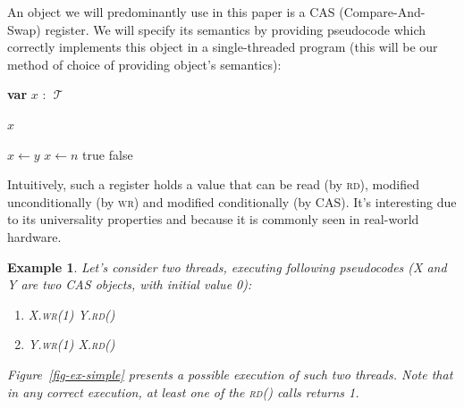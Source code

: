 \documentclass{thesis}
\def\T{\ensuremath{\operatorname{\mathcal{T}}}\text{ }}
\newtheorem{example}{Example}
\newcommand{\fn}[1]{\textsc{#1}}
\newcommand{\var}[2]{\textbf{var }#1 : #2}
\begin{document}


An object we will predominantly use in this paper is a CAS (Compare-And-Swap) register.
We will specify its semantics by providing pseudocode which correctly implements this object in
a single-threaded program (this will be our method of choice of providing object's semantics):

\begin{algorithmic}[1]
\State\var{$x$}{\T}
	
	\State\Return $x$
\EndFunction

	\State $x \gets y$
\EndFunction
\pagebreak
{}
	\State $x \gets n$
	\State\Return true
\Else
	\State\Return false
\EndIf
\EndFunction
\end{algorithmic}

Intuitively, such a register holds a value that can be read (by \fn{rd}), modified unconditionally (by \fn{wr})
and modified conditionally (by \fn{CAS}). It's interesting due to its universality properties\cite{cas-univ} %
and because it is
commonly seen in real-world hardware. %

\begin{example}\label{ex-simple}
Let's consider two threads, executing following pseudocodes (X and Y are two CAS objects, with initial value 0):

\begin{enumerate}
\item\begin{algorithmic}[1]
\State X.\fn{wr}(1)
\State Y.\fn{rd}()
\end{algorithmic}

\item\begin{algorithmic}[1]
\State Y.\fn{wr}(1)
\State X.\fn{rd}()
\end{algorithmic}
\end{enumerate}

Figure~\ref{fig-ex-simple} presents a possible execution of such two threads. Note that in any correct execution,
at least one of the \fn{rd}() calls returns 1.
\end{example}
\end{document}
